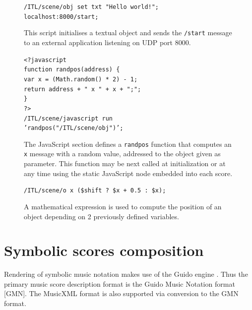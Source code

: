 \documentclass[11pt,a4paper]{article}
\newcommand{\OSC}[1]	{{\fontsize{10pt}{10pt} \selectfont\texttt{#1}}}
\newcommand{\tab}		{\hspace*{4mm}}
\newcommand{\sample}[1]	{\vspace{-0.2em}\begin{center}\colorbox{mygrey}{\begin{minipage}[t]{0.98\columnwidth} {\small \texttt{#1}}\end{minipage}}\end{center}}
\begin{document}
\begin{figure}[ht]
\begin{center}
\sample{/ITL/scene/obj set txt "Hello world!"; \\
localhost:8000/start;
}
\caption{This script initialises a textual object and sends the \OSC{/start} message to an external application listening on UDP port 8000.}
\label{fig:eosc}
\end{center}
\end{figure}

\begin{figure}[ht]
\begin{center}
\sample{<?javascript \\
\tab function randpos(address) \{\\
\tab \tab var x = (Math.random() * 2) - 1;\\
\tab \tab return address + " x " + x + ";"; \\
\tab\}\\
?> \\
/ITL/scene/javascript run \\
\tab \tab \tab \tab 'randpos("/ITL/scene/obj")'; 
}
\caption{The JavaScript section defines a \OSC{randpos} function that computes an \OSC{x} message with a random value, addressed to the object given as parameter. This function may be next called at initialization or at any time using the static JavaScript node embedded into each score.}
\label{fig:java}
\end{center}
\end{figure}

\begin{figure}[ht]
\begin{center}
\sample{/ITL/scene/o x (\$shift ? \$x + 0.5 : \$x);
}
\caption{A mathematical expression is used to compute the position of an object depending on 2 previously defined variables. }
\label{fig:math}
\end{center}
\end{figure}
 

\section{Symbolic scores composition}
\label{sec:scorecompo}

Rendering of symbolic music notation makes use of the Guido engine \cite{Dau:09b}. Thus the primary music score description format is the Guido Music Notation format \cite{hoos98} [GMN]. The MusicXML format \cite{good01} is also supported via conversion to the GMN format. 
\end{document}
